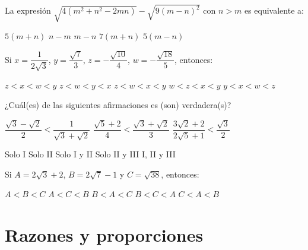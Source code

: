 \documentclass[pagina vacia]{srs}
\begin{document}
\begin{preguntas}
\pregunta La expresión \(\sqrt{4(m^2+n^2-2mn)} - \sqrt{9(m-n)^2}\) con \(n>m\) es equivalente a:
\begin{vertical}
\alternativa \(5(m+n)\)
\alternativa \(n-m\)
\alternativa \(m-n\)
\alternativa \(7(m+n)\)
\alternativa \(5(m-n)\)
\end{vertical}

\pregunta Si \(x = \dfrac{1}{2\sqrt{3}}\), \(y = \dfrac{\sqrt{7}}{3}\), \(z = -\dfrac{\sqrt{10}}{4}\), \(w = -\dfrac{\sqrt{18}}{5}\), entonces:
\begin{vertical}
\alternativa \(z<x<w<y\)
\alternativa \(z<w<y<x\)
\alternativa \(z<w<x<y\)
\alternativa \(w<z<x<y\)
\alternativa \(y<x<w<z\)
\end{vertical}

\pregunta ¿Cuál(es) de las siguientes afirmaciones es (son) verdadera(s)?
\begin{verticali}
\alternativa \(\dfrac{\sqrt{3}-\sqrt{2}}{2} < \dfrac{1}{\sqrt{3}+\sqrt{2}}\)
\alternativa \(\dfrac{\sqrt{5}+2}{4} < \dfrac{\sqrt{3}+\sqrt{2}}{3}\)
\alternativa \(\dfrac{3\sqrt{2}+2}{2\sqrt{5}+1} < \dfrac{\sqrt{3}}{2}\)
\end{verticali}
\begin{vertical}
\alternativa Solo I
\alternativa Solo II
\alternativa Solo I y II
\alternativa Solo II y III
\alternativa I, II y III
\end{vertical}

\pregunta Si \(A=2\sqrt{3}+2\), \(B=2\sqrt{7}-1\) y \(C=\sqrt{38}\), entonces:
\begin{vertical}
\alternativa \(A<B<C\)
\alternativa \(A<C<B\)
\alternativa \(B<A<C\)
\alternativa \(B<C<A\)
\alternativa \(C<A<B\)
\end{vertical}

\end{preguntas}

\section{Razones y proporciones}
\end{document}
